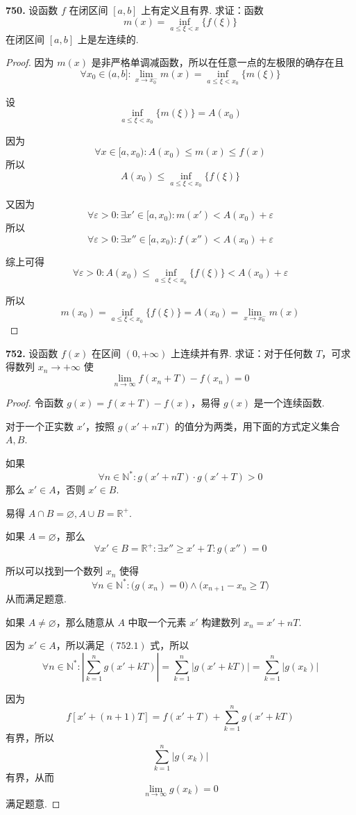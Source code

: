 \textbf{750.} 设函数 $f$ 在闭区间 $[a,b]$ 上有定义且有界. 求证：函数
\[m(x) = \inf_{a \leqslant \xi < x} \{f(\xi)\}\]
在闭区间 $[a,b]$ 上是左连续的.

\begin{proof}
    因为 $m(x)$ 是非严格单调减函数，所以在任意一点的左极限的确存在且
    \[\forall x_0 \in (a,b]: \lim_{x \rightarrow x_0^-} m(x) = \inf_{a \leqslant \xi < x_0} \{m(\xi)\}\]

    设
    \[\inf_{a \leqslant \xi < x_0} \{m(\xi)\} = A(x_0)\]

    因为
    \[\forall x \in [a,x_0): A(x_0) \leqslant m(x) \leqslant f(x)\]
    所以
    \[A(x_0) \leqslant \inf_{a \leqslant \xi < x_0} \{f(\xi)\}\]

    又因为
    \[\forall \varepsilon > 0: \exists x' \in [a,x_0): m(x') < A(x_0) + \varepsilon\]
    所以
    \[\forall \varepsilon > 0: \exists x'' \in [a,x_0): f(x'') < A(x_0) + \varepsilon\]

    综上可得
    \[\forall \varepsilon > 0: A(x_0) \leqslant \inf_{a \leqslant \xi < x_0}\{f(\xi)\} < A(x_0) + \varepsilon\]

    所以
    \[m(x_0) = \inf_{a \leqslant \xi < x_0} \{f(\xi)\} = A(x_0) = \lim_{x \rightarrow x_0^-} m(x)\]
\end{proof}\vspace{9pt}

\textbf{752.} 设函数 $f(x)$ 在区间 $(0, +\infty)$ 上连续并有界. 求证：对于任何数 $T$，可求得数列 $x_n \rightarrow +\infty$ 使
\[\lim_{n \rightarrow \infty} f(x_n + T) - f(x_n) = 0\]

\begin{proof}
    令函数 $g(x) = f(x+T) - f(x)$，易得 $g(x)$ 是一个连续函数.

    对于一个正实数 $x'$，按照 $g(x'+nT)$ 的值分为两类，用下面的方式定义集合 $A,B$.

    如果
    \[\forall n \in \mathbb{N}^*: g(x' + nT) \cdot g(x' + T) > 0 \tag{752.1}\]
    那么 $x' \in A$，否则 $x' \in B$.

    易得 $A \cap B = \varnothing, A \cup B = \mathbb{R}^+$.

    如果 $A = \varnothing$，那么
    \[\forall x' \in B = \mathbb{R}^+: \exists x'' \geqslant x' + T: g(x'') = 0\]

    所以可以找到一个数列 $x_n$ 使得
    \[\forall n \in \mathbb{N}^*: \bigl(g(x_n) = 0\bigr) \wedge \bigl(x_{n+1} - x_n \geqslant T\bigr)\]
    从而满足题意.

    如果 $A \neq \varnothing$，那么随意从 $A$ 中取一个元素 $x'$ 构建数列 $x_n = x' + nT$.

    因为 $x' \in A$，所以满足 $(752.1)$ 式，所以
    \[\forall n \in \mathbb{N}^*: \left| \sum_{k=1}^{n} g(x' + kT)\right| = \sum_{k=1}^{n} \lvert g(x' + kT)\rvert = \sum_{k=1}^{n} \lvert g(x_k)\rvert\]

    因为
    \[f[x' + (n+1)T] = f(x' + T) + \sum_{k=1}^{n} g(x' + kT)\]
    有界，所以
    \[\sum_{k=1}^{n} \lvert g(x_k)\rvert\]
    有界，从而
    \[\lim_{n \rightarrow \infty} g(x_k) = 0\]
    满足题意.
\end{proof}\vspace{9pt}

